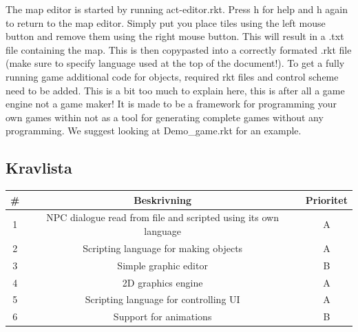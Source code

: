\documentclass[12pt,a4paper]{article}
\begin{document}
The map editor is started by running act-editor.rkt. Press h for help and h again to return to the map editor.
Simply put you place tiles using the left mouse button and remove them using the right mouse button.
This will result in a .txt file containing the map. This is then copypasted into a correctly formated .rkt file (make sure to specify language used at the top of the document!). To get a fully running game additional code for objects, required rkt files and control scheme need to be added.
This is a bit too much to explain here, this is after all a game engine not a game maker!
It is made to be a framework for programming your own games within not as a tool for generating complete games without any programming.
We suggest looking at Demo_game.rkt for an example.


\subsection{Kravlista}

\bigskip

\begin{tabular}{|c|c|c|}
\hline
\# & \textbf{Beskrivning} & \textbf{Prioritet} \\ \hline
1 & NPC dialogue read from file and scripted using its own language & A \\ \hline
2 & Scripting language for making objects & A \\ \hline
3 & Simple graphic editor & B \\ \hline
4 & 2D graphics engine & A \\ \hline
5 & Scripting language for controlling UI & A \\ \hline
6 & Support for animations & B \\ \hline
\end{tabular}
\end{document}
